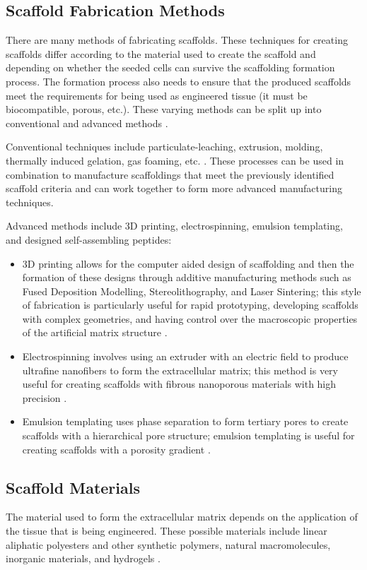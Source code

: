 \subsection{Scaffold Fabrication Methods}
There are many methods of fabricating scaffolds. These techniques for creating scaffolds differ according to the material used to create the scaffold and depending on whether the seeded cells can survive the scaffolding formation process. The formation process also needs to ensure that the produced scaffolds meet the requirements for being used as engineered tissue (it must be biocompatible, porous, etc.). These varying methods can be split up into conventional and advanced methods \citep{dutta_2017}.

Conventional techniques include particulate-leaching, extrusion, molding, thermally induced gelation, gas foaming, etc. \citep{dutta_2017}. These processes can be used in combination to manufacture scaffoldings that meet the previously identified scaffold criteria and can work together to form more advanced manufacturing techniques.

Advanced methods include 3D printing, electrospinning, emulsion templating, and designed self-assembling peptides:

\begin{itemize}
  \item 3D printing allows for the computer aided design of scaffolding and then the formation of these designs through additive manufacturing methods such as Fused Deposition Modelling, Stereolithography, and Laser Sintering; this style of fabrication is particularly useful for rapid prototyping, developing scaffolds with complex geometries, and having control over the macroscopic properties of the artificial matrix structure \citep{dutta_2017}. 
  \item Electrospinning involves using an extruder with an electric field to produce ultrafine nanofibers to form the extracellular matrix; this method is very useful for creating scaffolds with fibrous nanoporous materials with high precision \citep{dutta_2017}. 
  \item Emulsion templating uses phase separation to form tertiary pores to create scaffolds with a hierarchical pore structure; emulsion templating is useful for creating scaffolds with a porosity gradient \citep{dutta_2017}. 
\end{itemize}

\subsection{Scaffold Materials}
The material used to form the extracellular matrix depends on the application of the tissue that is being engineered. These possible materials include linear aliphatic polyesters and other synthetic polymers, natural macromolecules, inorganic materials, and hydrogels \citep{mapx2004}.

